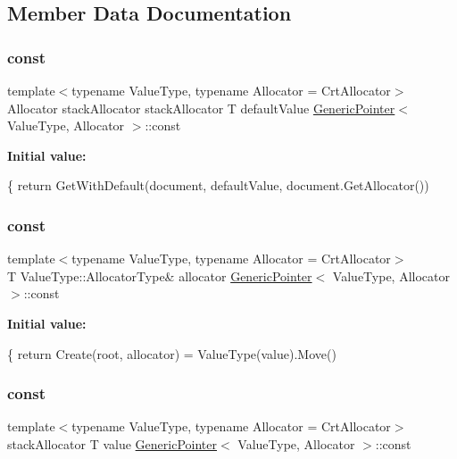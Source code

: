 \subsection{Member Data Documentation}
\mbox{\label{a02232_ad6e06cd83cf52e045c7e07a67078e973}} 
\subsubsection{\texorpdfstring{const}{const}\hspace{0.1cm}{\footnotesize\ttfamily [1/3]}}
{\footnotesize\ttfamily template$<$typename Value\+Type, typename Allocator = Crt\+Allocator$>$ \\
Allocator stack\+Allocator stack\+Allocator T default\+Value \hyperlink{a02232}{Generic\+Pointer}$<$ Value\+Type, Allocator $>$\+::const}

{\bfseries Initial value\+:}
\begin{DoxyCode}
\{
        \textcolor{keywordflow}{return} GetWithDefault(document, defaultValue, document.GetAllocator())
\end{DoxyCode}
\mbox{\label{a02232_ace82428d4ad958b05a52480d949b32fa}} 
\subsubsection{\texorpdfstring{const}{const}\hspace{0.1cm}{\footnotesize\ttfamily [2/3]}}
{\footnotesize\ttfamily template$<$typename Value\+Type, typename Allocator = Crt\+Allocator$>$ \\
T Value\+Type\+::\+Allocator\+Type\& allocator \hyperlink{a02232}{Generic\+Pointer}$<$ Value\+Type, Allocator $>$\+::const}

{\bfseries Initial value\+:}
\begin{DoxyCode}
\{
        \textcolor{keywordflow}{return} Create(root, allocator) = ValueType(value).Move()
\end{DoxyCode}
\mbox{\label{a02232_abb1b141cfe93b7159842b5cad60d1be3}} 
\subsubsection{\texorpdfstring{const}{const}\hspace{0.1cm}{\footnotesize\ttfamily [3/3]}}
{\footnotesize\ttfamily template$<$typename Value\+Type, typename Allocator = Crt\+Allocator$>$ \\
stack\+Allocator T value \hyperlink{a02232}{Generic\+Pointer}$<$ Value\+Type, Allocator $>$\+::const}

